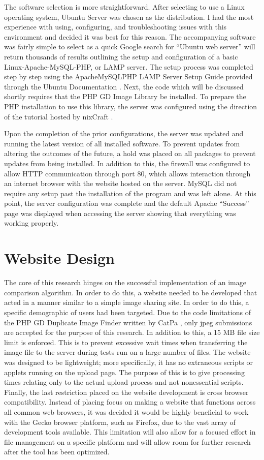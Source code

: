 The software selection is more straightforward. After selecting to use a Linux operating system, Ubuntu Server was chosen as the distribution. I had the most experience with using, configuring, and troubleshooting issues with this environment and decided it was best for this reason. The accompanying software was fairly simple to select as a quick Google search for ``Ubuntu web server'' will return thousands of results outlining the setup and configuration of a basic Linux-Apache-MySQL-PHP, or LAMP server. The setup process was completed step by step using the ApacheMySQLPHP LAMP Server Setup Guide provided through the Ubuntu Documentation \cite{ubuntu:lampsetup}. Next, the code which will be discussed shortly requires that the PHP GD Image Library be installed. To prepare the PHP installation to use this library, the server was configured using the direction of the tutorial hosted by nixCraft \cite{nix:gdsetup}.

Upon the completion of the prior configurations, the server was updated and running the latest version of all installed software. To prevent updates from altering the outcomes of the future, a hold was placed on all packages to prevent updates from being installed. In addition to this, the firewall was configured to allow HTTP communication through port 80, which allows interaction through an internet browser with the website hosted on the server. MySQL did not require any setup past the installation of the program and was left alone. At this point, the server configuration was complete and the default Apache ``Success'' page was displayed when accessing the server showing that everything was working properly.

\section{Website Design} \label{sec:websitedesign}
The core of this research hinges on the successful implementation of an image comparison algorithm. In order to do this, a website needed to be developed that acted in a manner similar to a simple image sharing site. In order to do this, a specific demographic of users had been targeted. Due to the code limitations of the PHP GD Duplicate Image Finder written by CatPa \cite{catpa:gdcode}, only jpeg submissions are accepted for the purpose of this research. In addition to this, a 15 MB file size limit is enforced. This is to prevent excessive wait times when transferring the image file to the server during tests run on a large number of files. The website was designed to be lightweight; more specifically, it has no extraneous scripts or applets running on the upload page. The purpose of this is to give processing times relating only to the actual upload process and not nonessential scripts. Finally, the last restriction placed on the website development is cross browser compatibility. Instead of placing focus on making a website that functions across all common web browsers, it was decided it would be highly beneficial to work with the Gecko browser platform, such as Firefox, due to the vast array of development tools available. This limitation will also allow for a focused effort in file management on a specific platform and will allow room for further research after the tool has been optimized.

